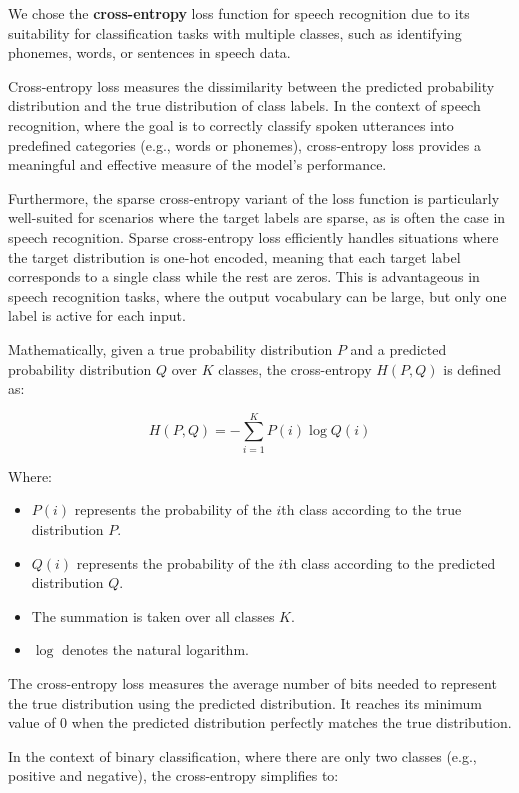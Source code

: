 \documentclass[a4paper]{report}
\begin{document}
{We chose the \textbf{cross-entropy} loss function for speech recognition due to its suitability for classification tasks with multiple classes, such as identifying phonemes, words, or sentences in speech data.

Cross-entropy loss measures the dissimilarity between the predicted probability distribution and the true distribution of class labels. In the context of speech recognition, where the goal is to correctly classify spoken utterances into predefined categories (e.g., words or phonemes), cross-entropy loss provides a meaningful and effective measure of the model's performance.

Furthermore, the sparse cross-entropy variant of the loss function is particularly well-suited for scenarios where the target labels are sparse, as is often the case in speech recognition. Sparse cross-entropy loss efficiently handles situations where the target distribution is one-hot encoded, meaning that each target label corresponds to a single class while the rest are zeros. This is advantageous in speech recognition tasks, where the output vocabulary can be large, but only one label is active for each input.

Mathematically, given a true probability distribution $P$ and a predicted probability distribution $Q$ over $K$ classes, the cross-entropy $H(P,Q)$ is defined as:

\[
H(P, Q) = -\sum_{i=1}^{K} P(i) \log Q(i)
\]

Where:
\begin{itemize}
    \item $P(i)$ represents the probability of the $i$th class according to the true distribution $P$.
    \item $Q(i)$ represents the probability of the $i$th class according to the predicted distribution $Q$.
    \item The summation is taken over all classes $K$.
    \item $\log$ denotes the natural logarithm.
\end{itemize}

The cross-entropy loss measures the average number of bits needed to represent the true distribution using the predicted distribution. It reaches its minimum value of 0 when the predicted distribution perfectly matches the true distribution.

In the context of binary classification, where there are only two classes (e.g., positive and negative), the cross-entropy simplifies to:

}
\end{document}
